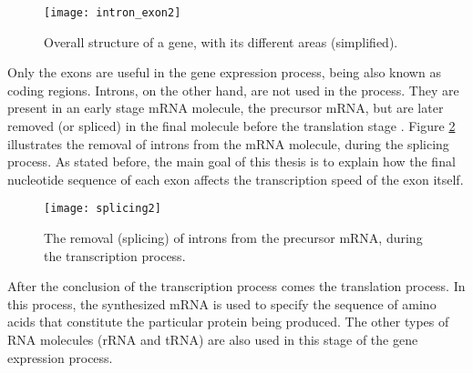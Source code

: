 \begin{figure}[!htb]
  \begin{center}
    \leavevmode
    \texttt{[image: intron\_exon2]}
    \caption[Overall structure of a gene]{Overall structure of a gene, with its
    different areas (simplified).}
    \label{fig:intron_exon}
  \end{center}
\end{figure}

Only the exons are useful in the gene expression process, being also known as
coding regions. Introns, on the other hand, are not used in the process. They
are present in an early stage mRNA molecule, the precursor mRNA, but are later
removed (or spliced) in the final molecule before the translation stage
\cite{leic:gene_expr}. Figure \ref{fig:splicing} illustrates the removal of
introns from the mRNA molecule, during the  splicing process. As stated before,
the main goal of this thesis is to explain how the final nucleotide sequence of
each exon affects the transcription speed of the exon itself.

\begin{figure}[!htb]
  \begin{center}
    \leavevmode
    \texttt{[image: splicing2]}
    \caption[Removal of introns from precursor mRNA]{The removal (splicing) of
    introns from the precursor mRNA, during the transcription process.}
    \label{fig:splicing}
  \end{center}
\end{figure}

After the conclusion of the transcription process comes the translation process.
In this process, the synthesized mRNA is used to specify the sequence of amino
acids that constitute the particular protein being produced. The other types of
RNA molecules (rRNA and tRNA) are also used in this stage of the gene expression
process.

